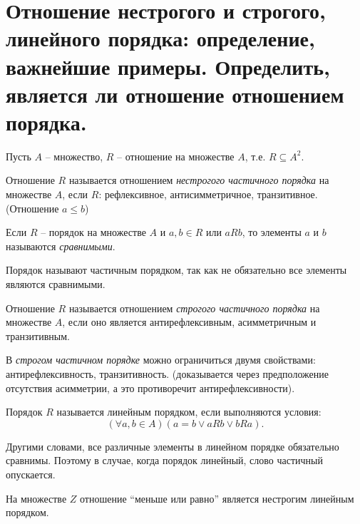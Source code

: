 \section{Отношение нестрогого и строгого, линейного порядка: определение, важнейшие примеры. 
Определить, является ли отношение отношением порядка.}

Пусть $A$ -- множество, $R$ -- отношение на множестве $A$, т.е. $R \subseteq A^2$.

\begin{definition}
    Отношение $R$ называется отношением \textit{нестрогого частичного
    порядка} на множестве $A$, если $R$: рефлексивное, антисимметричное,
    транзитивное. (Отношение $a \leq b$)
\end{definition}

\begin{definition}
    Если $R$ -- порядок на множестве $A$ и $a,b \in R$ или $aRb$, то
    элементы $a$ и $b$ называются \textit{сравнимыми}.
\end{definition}

Порядок называют частичным порядком, так как не обязательно все элементы
являются сравнимыми.

\begin{definition}
    Отношение $R$ называется отношением \textit{строгого частичного
    порядка} на множестве $A$, если оно является антирефлексивным,
    асимметричным и транзитивным.
\end{definition}

В \textit{строгом частичном порядке} можно ограничиться двумя свойствами:
антирефлексивность, транзитивность. (доказывается через предположение
отсутствия асимметрии, а это противоречит антирефлексивности).

\begin{definition}
    Порядок $R$ называется линейным порядком, если выполняются
    условия: $$(\forall a,b \in A)(a=b \vee aRb \vee bRa).$$
\end{definition}

Другими словами, все различные элементы в линейном порядке обязательно
сравнимы. Поэтому в случае, когда порядок линейный, слово частичный
опускается.

На множестве $Z$ отношение “меньше или равно” является нестрогим
линейным порядком.
